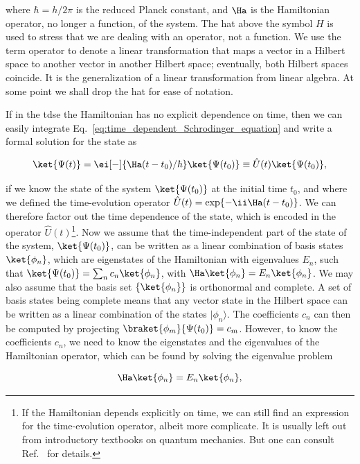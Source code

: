 \noindent where $\hbar = h / 2\pi$ is the reduced Planck constant, and $\Ha$ is the Hamiltonian operator, no longer a function, of the system.
The hat above the symbol $H$ is used to stress that we are dealing with an operator, not a function.
We use the term operator to denote a linear transformation that maps a vector in a Hilbert space to another vector in another Hilbert space; eventually, both Hilbert spaces coincide.
It is the generalization of a linear transformation from linear algebra.
At some point we shall drop the hat for ease of notation.

If in the \gls{tdse} the Hamiltonian has no explicit dependence on time, then we can easily integrate Eq.~\eqref{eq:time_dependent_Schrodinger_equation} and write a formal solution for the state as

\begin{equation}
    \label{eq:time_evolution_operator}
    \ket{\Psi(t)} = \ei[-]{\Ha (t-t_0)/\hbar} \ket{\Psi(t_0)} \equiv \hat{U}(t) \ket{\Psi(t_0)},
\end{equation}

\noindent if we know the state of the system $\ket{\Psi(t_0)}$ at the initial time $t_0$, and where we defined the time-evolution operator $\hat{U}(t) = \mathrm{exp} \{-\ii \Ha (t-t_0)\}$.
We can therefore factor out the time dependence of the state, which is encoded in the operator $\hat{U}(t)$\footnote{If the Hamiltonian depends explicitly on time, we can still find an expression for the time-evolution operator, albeit more complicate. It is usually left out from introductory textbooks on quantum mechanics. But one can consult Ref.~\cite{Sakurai} for details.}.
Now we assume that the time-independent part of the state of the system, $\ket{\Psi(t_0)}$, can be written as a linear combination of basis states $\ket{\phi_n}$, which are eigenstates of the Hamiltonian with eigenvalues $E_n$, such that $\ket{\Psi(t_0)} = \sum_n c_n \ket{\phi_n}$, with $\Ha \ket{\phi_n} = E_n \ket{\phi_n}$.
We may also assume that the basis set $\{\ket{\phi_n}\}$ is orthonormal and complete.
A set of basis states being complete means that any vector state in the Hilbert space can be written as a linear combination of the states $| \phi_n \rangle$.
The coefficients $c_n$ can then be computed by projecting $\braket{\phi_m}{\Psi(t_0)} = c_m$.
However, to know the coefficients $c_n$, we need to know the eigenstates and the eigenvalues of the Hamiltonian operator, which can be found by solving the eigenvalue problem

\begin{equation}
    \label{eq:time_independent_Schrodinger_equation}
    \Ha \ket{\phi_n} = E_n \ket{\phi_n},
\end{equation}


